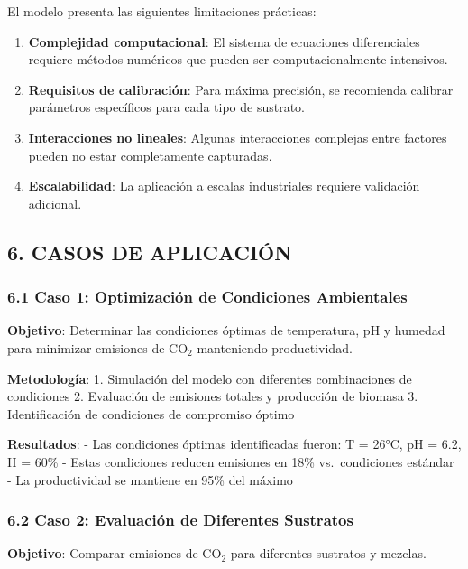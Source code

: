 \documentclass[
]{article}
\begin{document}
El modelo presenta las siguientes limitaciones prácticas:

\begin{enumerate}
\def\labelenumi{\arabic{enumi}.}
\item
  \textbf{Complejidad computacional}: El sistema de ecuaciones
  diferenciales requiere métodos numéricos que pueden ser
  computacionalmente intensivos.
\item
  \textbf{Requisitos de calibración}: Para máxima precisión, se
  recomienda calibrar parámetros específicos para cada tipo de sustrato.
\item
  \textbf{Interacciones no lineales}: Algunas interacciones complejas
  entre factores pueden no estar completamente capturadas.
\item
  \textbf{Escalabilidad}: La aplicación a escalas industriales requiere
  validación adicional.
\end{enumerate}

\subsection{6. CASOS DE APLICACIÓN}\label{casos-de-aplicaciuxf3n}

\subsubsection{6.1 Caso 1: Optimización de Condiciones
Ambientales}\label{caso-1-optimizaciuxf3n-de-condiciones-ambientales}

\textbf{Objetivo}: Determinar las condiciones óptimas de temperatura, pH
y humedad para minimizar emisiones de CO$_2$ manteniendo productividad.

\textbf{Metodología}: 1. Simulación del modelo con diferentes
combinaciones de condiciones 2. Evaluación de emisiones totales y
producción de biomasa 3. Identificación de condiciones de compromiso
óptimo

\textbf{Resultados}: - Las condiciones óptimas identificadas fueron: T =
26°C, pH = 6.2, H = 60\% - Estas condiciones reducen emisiones en 18\%
vs.~condiciones estándar - La productividad se mantiene en 95\% del
máximo

\subsubsection{6.2 Caso 2: Evaluación de Diferentes
Sustratos}\label{caso-2-evaluaciuxf3n-de-diferentes-sustratos}

\textbf{Objetivo}: Comparar emisiones de CO$_2$ para diferentes sustratos y
mezclas.
\end{document}
